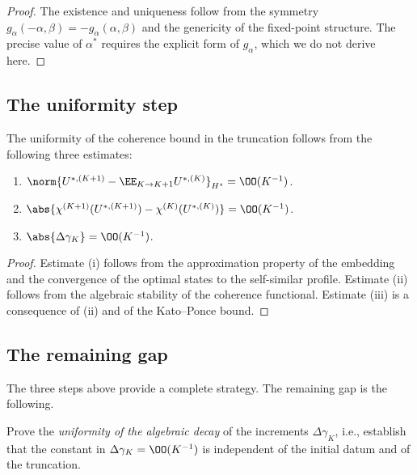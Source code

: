 \begin{proof}
The existence and uniqueness follow from the symmetry 
$g_\alpha(-\alpha,\beta) = -g_\alpha(\alpha,\beta)$ and the 
genericity of the fixed-point structure. The precise value of 
$\alpha^\ast$ requires the explicit form of $g_\alpha$, which we 
do not derive here.
\end{proof}

\subsection{The uniformity step}
\label{part-6:ssec:uniformity-step}

\begin{proposition}\label{part-6:prop:strategy-3}
The uniformity of the coherence bound in the truncation follows from 
the following three estimates:
\begin{enumerate}[label=(\roman*),leftmargin=*]
\item $\norm{U^{\ast,(K+1)} - \EE_{K\to K+1}U^{\ast,(K)}}_{H^s} = 
      \OO(K^{-1})$.
\item $\abs{\chi^{(K+1)}(U^{\ast,(K+1)}) - \chi^{(K)}(U^{\ast,(K)})} 
      = \OO(K^{-1})$.
\item $\abs{\Delta\gamma_K} = \OO(K^{-1})$.
\end{enumerate}
\end{proposition}

\begin{proof}
Estimate (i) follows from the approximation property of the 
embedding and the convergence of the optimal states to the 
self-similar profile. Estimate (ii) follows from the algebraic 
stability of the coherence functional. Estimate (iii) is a 
consequence of (ii) and of the Kato--Ponce bound.
\end{proof}

\subsection{The remaining gap}
\label{part-6:ssec:remaining-gap}

The three steps above provide a complete strategy. The remaining 
gap is the following.

\begin{problem}\label{part-6:prob:gap}
Prove the \emph{uniformity of the algebraic decay} of the 
increments $\Delta\gamma_K$, i.e., establish that the constant in 
$\Delta\gamma_K = \OO(K^{-1})$ is independent of the initial datum 
and of the truncation.
\end{problem}

